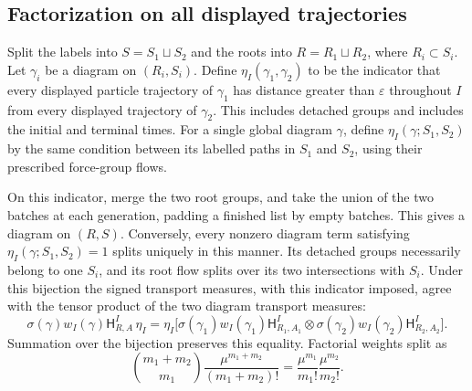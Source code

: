 \subsection{Factorization on all displayed trajectories}

\begin{proposition}
\label{cell:factorization}
Split the labels into $S=S_1\sqcup S_2$ and the roots into
$R=R_1\sqcup R_2$, where $R_i\subset S_i$.  Let $\gamma_i$ be a
diagram on $(R_i,S_i)$.  Define $\eta_I(\gamma_1,\gamma_2)$ to be the
indicator that every displayed particle trajectory of $\gamma_1$
has distance greater than $\varepsilon$ throughout $I$ from every
displayed trajectory of $\gamma_2$.  This includes detached groups
and includes the initial and terminal times.
For a single global diagram $\gamma$, define
$\eta_I(\gamma;S_1,S_2)$ by the same condition between its labelled
paths in $S_1$ and $S_2$, using their prescribed force-group flows.

On this indicator, merge the two root groups, and take the union of
the two batches at each generation, padding a finished list by empty
batches.  This gives a diagram on $(R,S)$.  Conversely, every nonzero
diagram term satisfying $\eta_I(\gamma;S_1,S_2)=1$ splits uniquely in
this manner.  Its detached groups necessarily belong to one $S_i$,
and its root flow splits over its two intersections with $S_i$.
Under this bijection the signed transport measures, with this
indicator imposed, agree with the tensor product of the two
diagram transport measures:
\begin{equation}
 \sigma(\gamma)w_I(\gamma)\mathsf H^I_{R,A}\,\eta_I
  =\eta_I\bigl[
       \sigma(\gamma_1)w_I(\gamma_1)\mathsf H^I_{R_1,A_1}
       \otimes
       \sigma(\gamma_2)w_I(\gamma_2)\mathsf H^I_{R_2,A_2}
             \bigr].
 \label{eq:cell-factorization}
\end{equation}
Summation over the bijection preserves this equality.  Factorial
weights split as
\begin{equation}
 \binom{m_1+m_2}{m_1}
       \frac{\mu^{m_1+m_2}}{(m_1+m_2)!}
   =\frac{\mu^{m_1}}{m_1!}\frac{\mu^{m_2}}{m_2!}.
 \label{eq:cell-factorial-split}
\end{equation}
\end{proposition}

